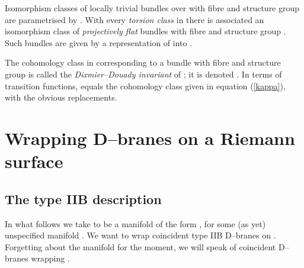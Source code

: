 \documentclass[a4paper,a4paper]{article}
\begin{document}
Isomorphism classes of locally trivial bundles \coordHE{} over \coordHE{}  
with fibre  \coordHE{} and structure group \coordHE{} are  
parametrised by \coordHE{}. With every {\it torsion class} in 
\coordHE{} there is associated an isomorphism class of 
{\it projectively flat} bundles \coordHE{} with fibre \coordHE{} 
and structure group \coordHE{} \cite{BOUWMATHAI}. 
Such bundles are given by a representation of \coordHE{} into 
\coordHE{} \cite{KOBAYASHI}.   
  
The cohomology class in \coordHE{} corresponding to a bundle 
\coordHE{} with fibre \coordHE{} and structure group \coordHE{}  
is called the {\it Dixmier--Douady invariant} of \coordHE{}; it is denoted  
\coordHE{} \cite{DIXMIER}. In terms of transition functions,  
\coordHE{} equals the cohomology class \myHighlight{$\kappa$}\coordHE{} given in equation 
(\ref{kappa}),  with the obvious replacements.  

\section{Wrapping D--branes on a \coordHE{} Riemann surface}\label{wrapping} 

\subsection{The type IIB description}\label{braneantibrane}  

In what follows we take \coordHE{} to be a manifold of the form \coordHE{}, for some (as yet) unspecified manifold \coordHE{}.  We want to wrap \coordHE{} coincident
type IIB  D\coordHE{}--branes on \coordHE{}. Forgetting about the manifold \coordHE{} for the moment, 
we will speak of \coordHE{} coincident D\coordHE{}--branes wrapping \myHighlight{$\Sigma$}\coordHE{}.
\end{document}
